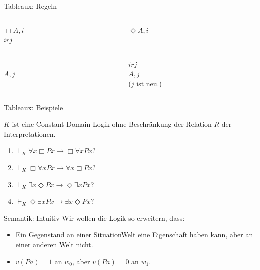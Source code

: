 \documentclass[12pt]{beamer}
\newcommand{\prule}{\vspace{-8pt}\rule{50pt}{0.5pt}}
\begin{document}
\begin{frame}{Tableaux: Regeln}
  \begin{columns}
    \begin{column}[t]{.5 \linewidth}
      \begin{center}
        $\Box A, i$ \\
        $irj$ \\
        \prule \\
        $A, j$
      \end{center}
    \end{column}
    \begin{column}[t]{.5 \linewidth}
      \begin{center}
        $\Diamond A, i$\\
        \prule \\
        $irj$ \\
        $A,j$ \\
        ($j$ ist neu.)
      \end{center}

    \end{column}
  \end{columns}

  
\end{frame}



\begin{frame}{Tableaux: Beispiele}

  $K$ ist eine Constant Domain Logik ohne Beschränkung der Relation
  $R$ der Interpretationen.
  \begin{enumerate}[<+->]
  \item $\vdash_K \forall x \Box Px \to \Box \forall x Px$?
  \item $\vdash_K \Box \forall x Px \to \forall x \Box Px$?
  \item $\vdash_K \exists x \Diamond Px \to \Diamond \exists x Px$?
  \item $\vdash_K \Diamond \exists x Px \to \exists x \Diamond Px$?
  \end{enumerate}


\end{frame}

\begin{frame}{Semantik: Intuitiv}
  Wir wollen die Logik so erweitern, dass: \pause
  \begin{itemize}[<+->]
  \item Ein Gegenstand an einer SituationWelt eine Eigenschaft haben
    kann, aber an einer anderen Welt nicht.
  \item $v(Pa) = 1$ an $w_0$, aber $v(Pa) = 0$ an $w_1$.
  \end{itemize}
\end{frame}
\end{document}
